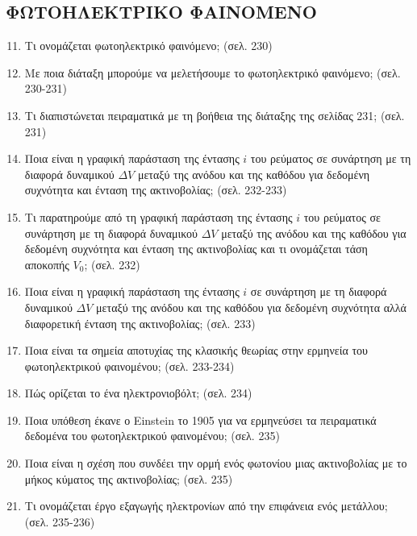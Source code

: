 \documentclass{article}
\begin{document}
\subsection{ΦΩΤΟΗΛΕΚΤΡΙΚΟ ΦΑΙΝΟΜΕΝΟ}
\begin{enumerate}
      \setcounter{enumi}{10}
      \item Τι ονομάζεται φωτοηλεκτρικό φαινόμενο; (σελ. 230)

      \item Με ποια διάταξη μπορούμε να μελετήσουμε το φωτοηλεκτρικό φαινόμενο; (σελ. 230-231)

      \item Τι διαπιστώνεται πειραματικά με τη βοήθεια της διάταξης της σελίδας 231; (σελ. 231)

      \item Ποια είναι η γραφική παράσταση της έντασης $i$ του ρεύματος σε συνάρτηση με τη διαφορά δυναμικού $\Delta V$ μεταξύ της ανόδου και της καθόδου για δεδομένη συχνότητα και ένταση της ακτινοβολίας; (σελ. 232-233)

      \item Τι παρατηρούμε από τη γραφική παράσταση της έντασης $i$ του ρεύματος σε συνάρτηση με τη διαφορά δυναμικού $\Delta V$ μεταξύ της ανόδου και της καθόδου για δεδομένη συχνότητα και ένταση της ακτινοβολίας και τι ονομάζεται τάση αποκοπής $V_0$; (σελ. 232)

      \item Ποια είναι η γραφική παράσταση της έντασης $i$ σε συνάρτηση με τη διαφορά δυναμικού $\Delta V$ μεταξύ της ανόδου και της καθόδου για δεδομένη συχνότητα αλλά διαφορετική ένταση της ακτινοβολίας; (σελ. 233)

      \item Ποια είναι τα σημεία αποτυχίας της κλασικής θεωρίας στην ερμηνεία του φωτοηλεκτρικού φαινομένου; (σελ. 233-234)

      \item Πώς ορίζεται το ένα ηλεκτρονιοβόλτ; (σελ. 234)

      \item Ποια υπόθεση έκανε ο Einstein το 1905 για να ερμηνεύσει τα πειραματικά δεδομένα του φωτοηλεκτρικού φαινομένου; (σελ. 235)

      \item Ποια είναι η σχέση που συνδέει την ορμή ενός φωτονίου μιας ακτινοβολίας με το μήκος κύματος της ακτινοβολίας; (σελ. 235)

      \item Τι ονομάζεται έργο εξαγωγής ηλεκτρονίων από την επιφάνεια ενός μετάλλου; (σελ. 235-236)


\end{enumerate}
\end{document}

